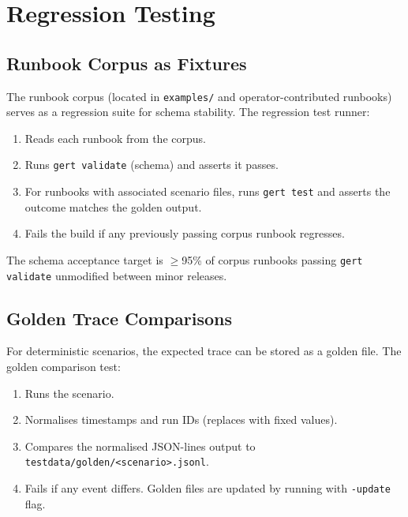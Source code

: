 \section{Regression Testing}

\subsection{Runbook Corpus as Fixtures}

The runbook corpus (located in \texttt{examples/} and operator-contributed runbooks) serves as a regression suite for schema stability. The regression test runner:

\begin{enumerate}
  \item Reads each runbook from the corpus.
  \item Runs \texttt{gert validate} (schema) and asserts it passes.
  \item For runbooks with associated scenario files, runs \texttt{gert test} and asserts the outcome matches the golden output.
  \item Fails the build if any previously passing corpus runbook regresses.
\end{enumerate}

The schema acceptance target is $\geq$95\% of corpus runbooks passing \texttt{gert validate} unmodified between minor releases.

\subsection{Golden Trace Comparisons}

For deterministic scenarios, the expected trace can be stored as a golden file. The golden comparison test:

\begin{enumerate}
  \item Runs the scenario.
  \item Normalises timestamps and run IDs (replaces with fixed values).
  \item Compares the normalised JSON-lines output to \texttt{testdata/golden/<scenario>.jsonl}.
  \item Fails if any event differs. Golden files are updated by running with \texttt{-update} flag.
\end{enumerate}

